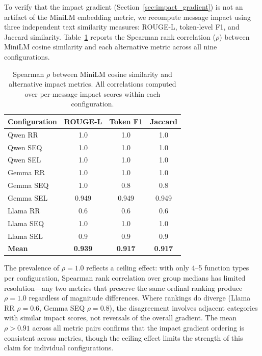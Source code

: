 To verify that the impact gradient (Section~\ref{sec:impact_gradient}) is not an artifact of the MiniLM embedding metric, we recompute message impact using three independent text similarity measures: ROUGE-L, token-level F1, and Jaccard similarity. Table~\ref{tab:metric_robustness} reports the Spearman rank correlation ($\rho$) between MiniLM cosine similarity and each alternative metric across all nine configurations.

\begin{table}[htbp]
\centering
\caption{Spearman $\rho$ between MiniLM cosine similarity and alternative impact metrics. All correlations computed over per-message impact scores within each configuration.}
\label{tab:metric_robustness}
\small
\begin{tabular}{lccc}
\toprule
\textbf{Configuration} & \textbf{ROUGE-L} & \textbf{Token F1} & \textbf{Jaccard} \\
\midrule
Qwen RR   & 1.0 & 1.0 & 1.0 \\
Qwen SEQ  & 1.0 & 1.0 & 1.0 \\
Qwen SEL  & 1.0 & 1.0 & 1.0 \\
Gemma RR  & 1.0 & 1.0 & 1.0 \\
Gemma SEQ & 1.0 & 0.8 & 0.8 \\
Gemma SEL & 0.949 & 0.949 & 0.949 \\
Llama RR  & 0.6 & 0.6 & 0.6 \\
Llama SEQ & 1.0 & 1.0 & 1.0 \\
Llama SEL & 0.9 & 0.9 & 0.9 \\
\midrule
\textbf{Mean} & \textbf{0.939} & \textbf{0.917} & \textbf{0.917} \\
\bottomrule
\end{tabular}
\end{table}

The prevalence of $\rho = 1.0$ reflects a ceiling effect: with only 4--5 function types per configuration, Spearman rank correlation over group medians has limited resolution---any two metrics that preserve the same ordinal ranking produce $\rho = 1.0$ regardless of magnitude differences. Where rankings do diverge (Llama RR $\rho = 0.6$, Gemma SEQ $\rho = 0.8$), the disagreement involves adjacent categories with similar impact scores, not reversals of the overall gradient. The mean $\rho > 0.91$ across all metric pairs confirms that the impact gradient ordering is consistent across metrics, though the ceiling effect limits the strength of this claim for individual configurations.

